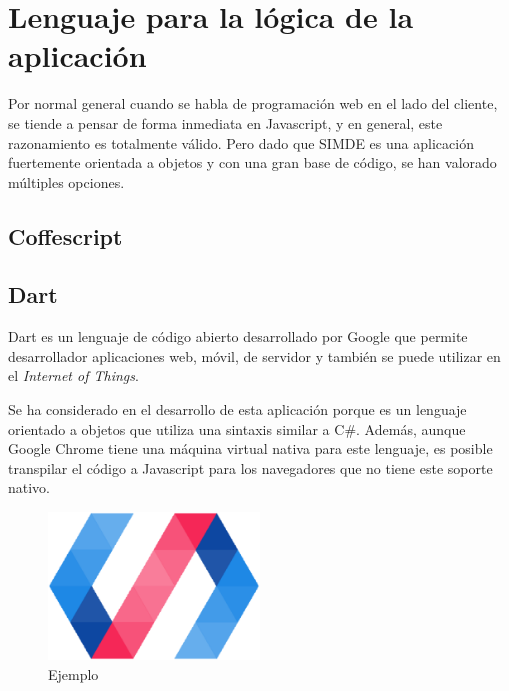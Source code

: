 
\section{Lenguaje para la lógica de la aplicación}
\label{3:sec1}

Por normal general cuando se habla de programación web en el lado del cliente, se tiende a pensar
de forma inmediata en Javascript, y en general, este razonamiento es totalmente válido. Pero dado que SIMDE
es una aplicación fuertemente orientada a objetos y con una gran base de código, se han valorado múltiples opciones.

\subsection{Coffescript}

\subsection{Dart}

Dart es un lenguaje de código abierto desarrollado por Google que permite desarrollador aplicaciones web, móvil, 
de servidor y también se puede utilizar en el \textit{Internet of Things}. 

\bigskip
Se ha considerado en el desarrollo de esta aplicación porque es un lenguaje orientado a objetos que utiliza una 
sintaxis similar a C\#. Además, aunque Google Chrome tiene una máquina virtual nativa para este lenguaje, es posible
transpilar el código a Javascript para los navegadores que no tiene este soporte nativo.

\begin{figure}[!th]
\begin{center}
\includegraphics[width=0.5\textwidth]{images/cap3/polymerlogo.eps}
\caption{Ejemplo}
\label{fig:ArbolBinario}
\end{center}
\end{figure}

